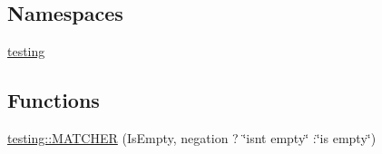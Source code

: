 \subsection*{Namespaces}
\begin{DoxyCompactItemize}
\item 
 \hyperlink{namespacetesting}{testing}
\end{DoxyCompactItemize}
\subsection*{Functions}
\begin{DoxyCompactItemize}
\item 
\hyperlink{namespacetesting_a4fcb3f407119590471bea5a90a8d2dda}{testing\+::\+M\+A\+T\+C\+H\+ER} (Is\+Empty, negation ? \char`\"{}isn\textquotesingle{}t empty\char`\"{} \+:\char`\"{}is empty\char`\"{})
\end{DoxyCompactItemize}
